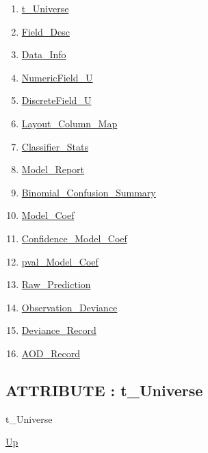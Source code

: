 \par
\par
\begin{enumerate}
\item \hyperlink{ecldoc:logisticregression.types.t_universe}{t\_Universe}
\item \hyperlink{ecldoc:logisticregression.types.field_desc}{Field\_Desc}
\item \hyperlink{ecldoc:logisticregression.types.data_info}{Data\_Info}
\item \hyperlink{ecldoc:logisticregression.types.numericfield_u}{NumericField\_U}
\item \hyperlink{ecldoc:logisticregression.types.discretefield_u}{DiscreteField\_U}
\item \hyperlink{ecldoc:logisticregression.types.layout_column_map}{Layout\_Column\_Map}
\item \hyperlink{ecldoc:logisticregression.types.classifier_stats}{Classifier\_Stats}
\item \hyperlink{ecldoc:logisticregression.types.model_report}{Model\_Report}
\item \hyperlink{ecldoc:logisticregression.types.binomial_confusion_summary}{Binomial\_Confusion\_Summary}
\item \hyperlink{ecldoc:logisticregression.types.model_coef}{Model\_Coef}
\item \hyperlink{ecldoc:logisticregression.types.confidence_model_coef}{Confidence\_Model\_Coef}
\item \hyperlink{ecldoc:logisticregression.types.pval_model_coef}{pval\_Model\_Coef}
\item \hyperlink{ecldoc:logisticregression.types.raw_prediction}{Raw\_Prediction}
\item \hyperlink{ecldoc:logisticregression.types.observation_deviance}{Observation\_Deviance}
\item \hyperlink{ecldoc:logisticregression.types.deviance_record}{Deviance\_Record}
\item \hyperlink{ecldoc:logisticregression.types.aod_record}{AOD\_Record}
\end{enumerate}
\subsection*{ATTRIBUTE : t\_Universe}
\hypertarget{ecldoc:logisticregression.types.t_universe}{}
\begin{minipage}[t]{\textwidth}
\begin{flushleft}
 t\_Universe 
\end{flushleft}
\end{minipage}
\hyperlink{ecldoc:LogisticRegression.Types}{Up}


